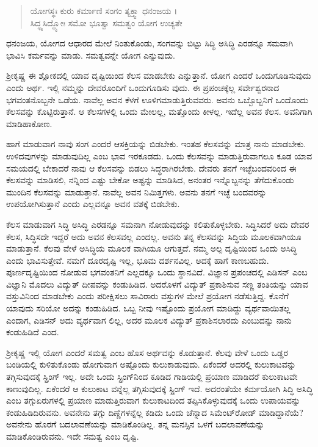 \begin{verse}
ಯೋಗಸ್ಥಃ ಕುರು ಕರ್ಮಾಣಿ ಸಂಗಂ ತ್ಯಕ್ತ್ವಾ ಧನಂಜಯ ।\\ಸಿದ್ಧ್ಯಸಿದ್ಧ್ಯೋಃ ಸಮೋ ಭೂತ್ವಾ ಸಮತ್ವಂ ಯೋಗ ಉಚ್ಯತೇ 
\end{verse}

{\small ಧನಂಜಯ, ಯೋಗದ ಆಧಾರದ ಮೇಲೆ ನಿಂತುಕೊಂಡು, ಸಂಗವನ್ನು ಬಿಟ್ಟು ಸಿದ್ಧಿ ಅಸಿದ್ಧಿ ಎರಡನ್ನೂ ಸಮವಾಗಿ ಭಾವಿಸಿ ಕರ್ಮವನ್ನು ಮಾಡು. ಸಮತ್ವವನ್ನೇ ಯೋಗ ಎನ್ನುವುದು.}

ಶ್ರೀಕೃಷ್ಣ ಈ ಶ್ಲೋಕದಲ್ಲಿ ಯಾವ ದೃಷ್ಟಿಯಿಂದ ಕೆಲಸ ಮಾಡಬೇಕು ಎನ್ನುತ್ತಾನೆ. ಯೋಗ ಎಂದರೆ ಒಂದುಗೂಡಿಸುವುದು ಎಂದು ಅರ್ಥ. ಇಲ್ಲಿ ನಮ್ಮನ್ನು ದೇವರೊಂದಿಗೆ ಒಂದುಗೂಡಿಸು ವುದು. ಈ ಪ್ರಪಂಚಕ್ಕೆಲ್ಲ ಸರ್ವೇಶ್ವರನಾದ ಭಗವಂತನೊಬ್ಬನೇ ಒಡೆಯ. ನಾವೆಲ್ಲ ಅವನ ಕೆಳಗೆ ಊಳಿಗಮಾಡುತ್ತಿರುವವರು. ಅವನು ಒಬ್ಬೊಬ್ಬನಿಗೆ ಒಂದೊಂದು ಕೆಲಸವನ್ನು ಕೊಟ್ಟಿರುತ್ತಾನೆ. ಆ ಕೆಲಸಗಳಲ್ಲಿ ಒಂದು ಮೇಲಲ್ಲ, ಮತ್ತೊಂದು ಕೀಳಲ್ಲ. ಇದೆಲ್ಲ ಅವನ ಕೆಲಸ. ಅವನಿಗಾಗಿ ಮಾಡಿಹಾಕೋಣ.

ಹಾಗೆ ಮಾಡುವಾಗ ನಾವು ಸಂಗ ಎಂದರೆ ಆಸಕ್ತಿಯನ್ನು ಬಿಡಬೇಕು. ಇಂತಹ ಕೆಲಸವನ್ನು ಮಾತ್ರ ನಾನು ಮಾಡಬೇಕು. ಉಳಿದವುಗಳನ್ನು ಮಾಡುವುದಿಲ್ಲ ಎಂಬ ಭಾವ ಇರಕೂಡದು. ಒಂದು ಕೆಲಸವನ್ನು ಮಾಡುತ್ತಿರುವಾಗಲೂ ಕೂಡ ಯಾವ ಸಮಯದಲ್ಲಿ ಬೇಕಾದರೆ ನಾವು ಆ ಕೆಲಸವನ್ನು ಬಿಡಲು ಸಿದ್ಧರಾಗಿರಬೇಕು. ದೇವರು ತನಗೆ ಇಚ್ಛೆಬಂದವರಿಂದ ಈ ಕೆಲಸವನ್ನು ಮಾಡಿಸಲಿ, ನನ್ನಿಂದ ಎಷ್ಟು ಬೇಕೋ ಅಷ್ಟನ್ನು ಮಾಡಿಸಿದ, ಅನಂತರ ಇನ್ನೊಬ್ಬನನ್ನು ತೆಗೆದುಕೊಂಡು ಮುಂದಿನ ಕೆಲಸವನ್ನು ಮಾಡುತ್ತಾನೆ. ನಾವೆಲ್ಲ ಅವನ ನಿಮಿತ್ತಗಳು. ಅವನು ತನಗೆ ಇಚ್ಛೆ ಬಂದವರನ್ನು ಉಪಯೋಗಿಸುತ್ತಾನೆ ಎಂದು ಎಲ್ಲವನ್ನೂ ಅವನ ವಶಕ್ಕೆ ಬಿಡಬೇಕು.

ಕೆಲಸ ಮಾಡುವಾಗ ಸಿದ್ಧಿ ಅಸಿದ್ಧಿ ಎರಡನ್ನೂ ಸಮನಾಗಿ ನೋಡುವುದನ್ನು ಕಲಿತುಕೊಳ್ಳಬೇಕು. ಸಿದ್ಧಿಸಿದರೆ ಅದು ದೇವರ ಕೆಲಸ, ಸಿದ್ಧಿಸದೇ ಇದ್ದರೆ ಅದು ಅವನ ಕೆಲಸವಲ್ಲ ಎಂದಲ್ಲ. ಅವನು ತನ್ನ ಕೆಲಸವನ್ನು ಸಿದ್ಧಿಯ ಮೂಲಕವಾಗಿಯೂ ಮಾಡುತ್ತಾನೆ. ಕೆಲವು ವೇಳೆ ಅಸಿದ್ಧಿಯ ಮೂಲಕ ವಾಗಿಯೂ ಆಗುತ್ತದೆ. ನಮ್ಮ ಅಲ್ಪ ದೃಷ್ಟಿಯಿಂದ ಒಂದು ಅಸಿದ್ಧಿ ಎಂದು ಭಾವಿಸುತ್ತೇವೆ. ನಮಗೆ ದೂರದೃಷ್ಟಿ ಇಲ್ಲ, ಭೂಮ ದರ್ಶನವಿಲ್ಲ. ಅದಕ್ಕೆ ಹಾಗೆ ಕಾಣಬಹುದು. ಪೂರ್ಣದೃಷ್ಟಿಯಿಂದ ನೋಡುವ ಭಗವಂತನಿಗೆ ಎಲ್ಲದಕ್ಕೂ ಒಂದು ಸ್ಥಾನವಿದೆ. ವಿಜ್ಞಾನ ಪ್ರಪಂಚದಲ್ಲಿ ಎಡಿಸನ್ ಎಂಬ ವಿಜ್ಞಾನಿ ಮೊದಲು ವಿದ್ಯುತ್ ದೀಪವನ್ನು ಕಂಡುಹಿಡಿದ. ಅದರೊಳಗೆ ವಿದ್ಯುತ್ ಪ್ರಕಾಶಿಸುವ ಸಣ್ಣ ತಂತಿಯನ್ನು ಯಾವ ವಸ್ತುವಿನಿಂದ ಮಾಡಬೇಕು ಎಂದು ಪರೀಕ್ಷಿಸಲು ಸಾವಿರಾರು ವಸ್ತುಗಳ ಮೇಲೆ ಪ್ರಯೋಗ ನಡೆಸುತ್ತಿದ್ದ. ಕೊನೆಗೆ ಯಾವುದು ಸರಿಯೋ ಅದನ್ನು ಕಂಡುಹಿಡಿದ. ಒಬ್ಬ ನೀವು ಇಷ್ಟೊಂದು ಪ್ರಯೋಗ ಮಾಡಿದ್ದು ವ್ಯರ್ಥವಾಯಿತಲ್ಲ ಎಂದಾಗ, ಎಡಿಸನ್ ಅದು ವ್ಯರ್ಥವಾಗ ಲಿಲ್ಲ, ಅದರ ಮೂಲಕ ವಿದ್ಯುತ್ ಪ್ರಕಾಶಿಸಲಾರದು ಎಂಬುದನ್ನು ನಾನು ಕಂಡುಹಿಡಿದೆ ಎಂದ.

ಶ್ರೀಕೃಷ್ಣ ಇಲ್ಲಿ ಯೋಗ ಎಂದರೆ ಸಮತ್ವ ಎಂಬ ಹೊಸ ಅರ್ಥವನ್ನು ಕೊಡುತ್ತಾನೆ. ಕೆಲವು ವೇಳೆ ಒಂದು ಒಡ್ಡರ ಬಂಡಿಯಲ್ಲಿ ಕುಳಿತುಕೊಂಡು ಹೋಗುವಾಗ ಅಷ್ಟೊಂದು ಕುಲುಕಾಡುವುದು. ಏಕೆಂದರೆ ಅದರಲ್ಲಿ ಕುಲುಕಾಟವನ್ನು ತಗ್ಗಿಸುವುದಕ್ಕೆ ಸ್ಪ್ರಿಂಗ್ ಇಲ್ಲ. ಅದೇ ಒಂದು ಸ್ಪ್ರಿಂಗ್​ನಿಂದ ಕೂಡಿದ ಗಾಡಿಯಲ್ಲಿ ಪ್ರಯಾಣ ಮಾಡಿದರೆ ಕುಲುಕಾಟವೇ ಕಾಣುವುದಿಲ್ಲ. ಏಕೆಂದರೆ ಆ ಕುಲುಕಾಟ ವನ್ನೆಲ್ಲ ತಗ್ಗಿಸುವುದಕ್ಕೆ ಸ್ಪ್ರಿಂಗ್ ಇದೆ. ಅದರಂತೆಯೇ ಕರ್ಮಯೋಗಿ ಸಿದ್ಧಿ ಅಸಿದ್ಧಿ ಎಂಬ ತಗ್ಗುಏರುಗಳಲ್ಲಿ ಪ್ರಯಾಣ ಮಾಡುತ್ತಿರುವಾಗ ಕುಲುಕಾಟದಿಂದ ತಪ್ಪಿಸಿಕೊಳ್ಳುವುದಕ್ಕೆ ಒಂದು ಉಪಾಯವನ್ನು ಕಂಡುಹಿಡಿದಿರುವನು. ಅವನೇನು ತಗ್ಗು ದಿಣ್ಣೆಗಳನ್ನೆಲ್ಲ ಕಡಿದು ಒಂದು ಚೆನ್ನಾದ ಸಿಮೆಂಟ್​ರೋಡ್ ಮಾಡಿದ್ದಾನೆಯೆ? ಅವನೇನು ಹೊರಗೆ ಬದಲಾವಣೆಯನ್ನು ಮಾಡಿಕೊಂಡಿಲ್ಲ. ತನ್ನ ಮನಸ್ಸಿನ ಒಳಗೆ ಬದಲಾವಣೆಯನ್ನು ಮಾಡಿಕೊಂಡಿರುವನು. ಇದೇ ಸಮತ್ವ ಎಂಬ ದೃಷ್ಟಿ.

